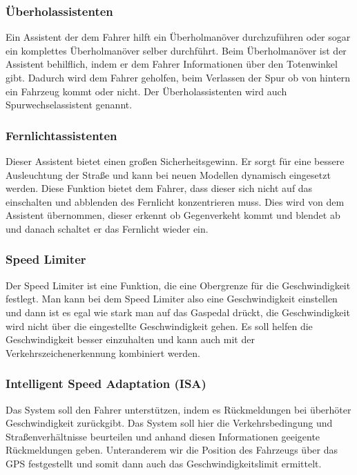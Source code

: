         \subsubsection{Überholassistenten}
        Ein Assistent der dem Fahrer hilft ein Überholmanöver durchzuführen oder sogar ein
        komplettes Überholmanöver selber durchführt. Beim Überholmanöver ist der Assistent 
        behilflich, indem er dem Fahrer Informationen über den Totenwinkel gibt. Dadurch 
        wird dem Fahrer geholfen, beim Verlassen der Spur ob von hintern ein Fahrzeug kommt 
        oder nicht. Der Überholassistenten wird auch Spurwechselassistent genannt.
        ~\cite{ueberholassi.PB1} ~\cite{spurwechsel.PB1} ~\cite{assistenzsysteme.PB1} 
        ~\cite{assistenzsysteme.PB2}
        
        \subsubsection{Fernlichtassistenten}
        Dieser Assistent bietet einen großen Sicherheitsgewinn. Er sorgt für eine bessere
        Ausleuchtung der Straße und kann bei neuen Modellen dynamisch eingesetzt werden.
        Diese Funktion bietet dem Fahrer, dass dieser sich nicht auf das einschalten und
        abblenden des Fernlicht konzentrieren muss. Dies wird von dem Assistent übernommen,
        dieser erkennt ob Gegenverkeht kommt und blendet ab und danach schaltet er das Fernlicht
        wieder ein.
        ~\cite{assistenzsysteme.PB2} ~\cite{Audi.PB1}

        \subsubsection{Speed Limiter}
        Der Speed Limiter ist eine Funktion, die eine Obergrenze für die Geschwindigkeit festlegt.
        Man kann bei dem Speed Limiter also eine Geschwindigkeit einstellen 
        und dann ist es egal wie stark man auf das Gaspedal drückt, die Geschwindigkeit wird nicht 
        über die eingestellte Geschwindigkeit gehen. Es soll helfen die Geschwindigkeit besser 
        einzuhalten und kann auch mit der Verkehrszeichenerkennung kombiniert werden.
        ~\cite{assistenzsysteme.PB2} ~\cite{assistenzsysteme.PB2} 

        \subsubsection{Intelligent Speed Adaptation (ISA)}
        Das System soll den Fahrer unterstützen, indem es Rückmeldungen bei überhöter Geschwindigkeit
        zurückgibt. Das System soll hier die Verkehrsbedingung und Straßenverhältnisse beurteilen und
        anhand diesen Informationen geeigente Rückmeldungen geben. Unteranderem wir die Position des 
        Fahrzeugs über das GPS festgestellt und somit dann auch das Geschwindigkeitslimit ermittelt.
        ~\cite{ISA.PB1}  ~\cite{speedlimiter.PB1} ~\cite{ISA.PB2}

